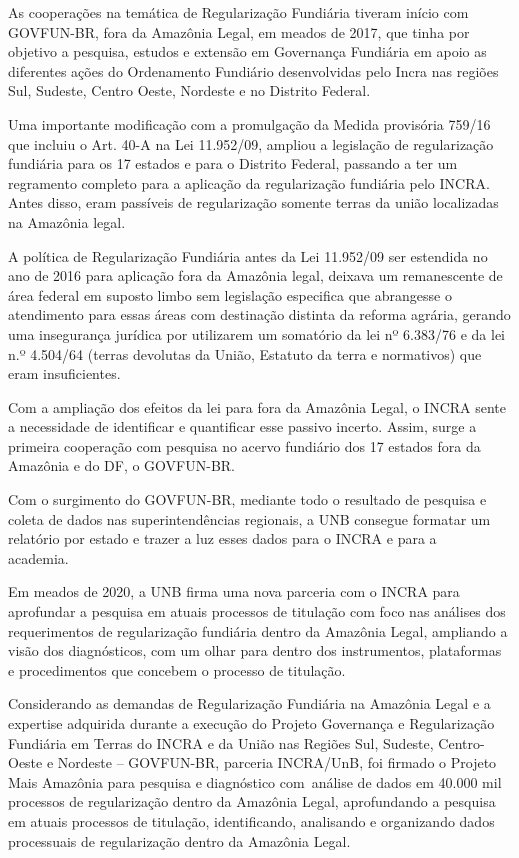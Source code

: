 \documentclass[
  letterpaper,
]{report}
\begin{document}
As cooperações na temática de Regularização Fundiária tiveram início com
GOVFUN-BR, fora da Amazônia Legal, em meados de 2017, que tinha por
objetivo a pesquisa, estudos e extensão em Governança Fundiária em apoio
as diferentes ações do Ordenamento Fundiário desenvolvidas pelo Incra
nas regiões Sul, Sudeste, Centro Oeste, Nordeste e no Distrito
Federal.~~

Uma importante modificação com a promulgação da Medida provisória 759/16
que incluiu o Art. 40-A na Lei 11.952/09, ampliou a legislação de
regularização fundiária para os 17 estados e para o Distrito Federal,
passando a ter um regramento completo para a aplicação da regularização
fundiária pelo INCRA. Antes disso, eram passíveis de regularização
somente terras da união localizadas na Amazônia legal.~~~

A política de Regularização Fundiária antes da Lei 11.952/09 ser
estendida no ano de 2016 para aplicação fora da Amazônia legal, deixava
um remanescente de área federal em suposto limbo sem legislação
especifica que abrangesse o atendimento para essas áreas com destinação
distinta da reforma agrária, gerando uma insegurança jurídica por
utilizarem um somatório da lei nº 6.383/76 e da lei n.º 4.504/64 (terras
devolutas da União, Estatuto da terra e normativos) que eram
insuficientes.~

Com a ampliação dos efeitos da lei para fora da Amazônia Legal, o INCRA
sente a necessidade de identificar e quantificar esse passivo incerto.
Assim, surge a primeira cooperação com pesquisa no acervo fundiário dos
17 estados fora da Amazônia e do DF, o GOVFUN-BR.~

Com o surgimento do GOVFUN-BR, mediante todo o resultado de pesquisa e
coleta de dados nas superintendências regionais, a UNB consegue formatar
um relatório por estado e trazer a luz esses dados para o INCRA e para a
academia.~~

Em meados de 2020, a UNB firma uma nova parceria com o INCRA para
aprofundar a pesquisa em atuais processos de titulação com foco nas
análises dos requerimentos de regularização fundiária dentro da Amazônia
Legal, ampliando a visão dos diagnósticos, com um olhar para dentro dos
instrumentos, plataformas e procedimentos que concebem o processo de
titulação.~~

Considerando as demandas de Regularização Fundiária na Amazônia Legal e
a expertise adquirida durante a execução do Projeto Governança e
Regularização Fundiária em Terras do INCRA e da União nas Regiões Sul,
Sudeste, Centro-Oeste e Nordeste -- GOVFUN-BR, parceria INCRA/UnB, foi
firmado o Projeto Mais Amazônia para pesquisa e diagnóstico com~análise
de dados em 40.000 mil processos de regularização dentro da Amazônia
Legal, aprofundando a pesquisa em atuais processos de titulação,
identificando, analisando e organizando dados processuais de
regularização dentro da Amazônia Legal.~
\end{document}
